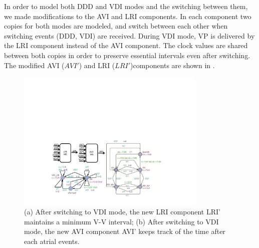 In order to model both DDD and VDI modes and the switching between them, we made modifications to the AVI and LRI components.
In each component two copies for both modes are modeled, and switch between each other when switching events (DDD, VDI) are received. During VDI mode, VP is delivered by the LRI component instead of the AVI component. The clock values are shared between both copies in order to preserve essential intervals even after switching. The modified AVI ($AVI'$) and LRI ($LRI'$)components are shown in . 
\begin{figure}
		\centering
		\includegraphics[width=0.8\textwidth]{figs/AVI_ms.pdf}
		\caption{\small (a) After switching to \textsf{VDI} mode, the new LRI component \textsf{LRI'} maintains a minimum V-V interval; (b) After switching to \textsf{VDI} mode, the new AVI component \textsf{AVI'} keeps track of the time after each atrial events.}
		\label{fig:avi_ms}
\end{figure}
